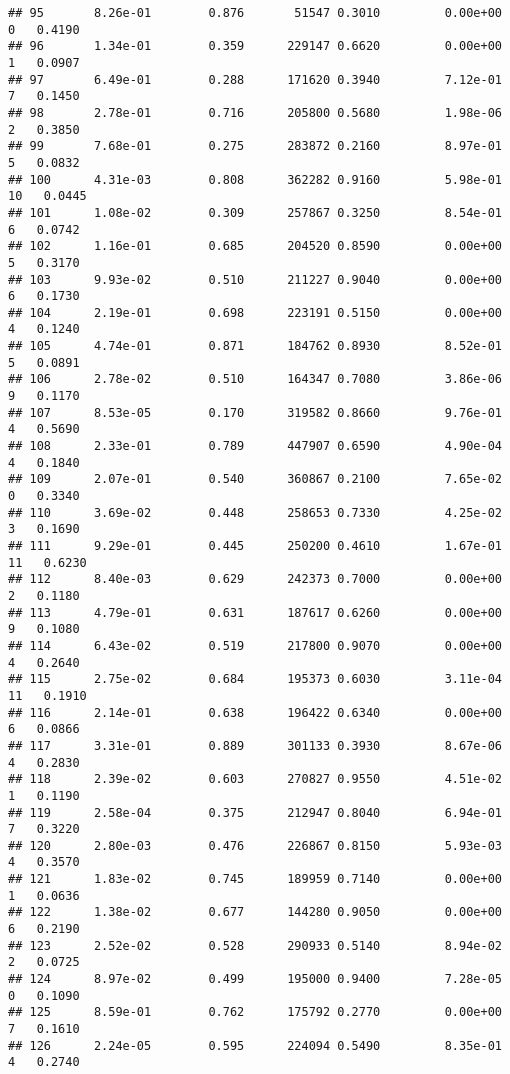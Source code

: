 \documentclass[
]{article}
\begin{document}
\begin{verbatim}
## 95       8.26e-01        0.876       51547 0.3010         0.00e+00   0   0.4190
## 96       1.34e-01        0.359      229147 0.6620         0.00e+00   1   0.0907
## 97       6.49e-01        0.288      171620 0.3940         7.12e-01   7   0.1450
## 98       2.78e-01        0.716      205800 0.5680         1.98e-06   2   0.3850
## 99       7.68e-01        0.275      283872 0.2160         8.97e-01   5   0.0832
## 100      4.31e-03        0.808      362282 0.9160         5.98e-01  10   0.0445
## 101      1.08e-02        0.309      257867 0.3250         8.54e-01   6   0.0742
## 102      1.16e-01        0.685      204520 0.8590         0.00e+00   5   0.3170
## 103      9.93e-02        0.510      211227 0.9040         0.00e+00   6   0.1730
## 104      2.19e-01        0.698      223191 0.5150         0.00e+00   4   0.1240
## 105      4.74e-01        0.871      184762 0.8930         8.52e-01   5   0.0891
## 106      2.78e-02        0.510      164347 0.7080         3.86e-06   9   0.1170
## 107      8.53e-05        0.170      319582 0.8660         9.76e-01   4   0.5690
## 108      2.33e-01        0.789      447907 0.6590         4.90e-04   4   0.1840
## 109      2.07e-01        0.540      360867 0.2100         7.65e-02   0   0.3340
## 110      3.69e-02        0.448      258653 0.7330         4.25e-02   3   0.1690
## 111      9.29e-01        0.445      250200 0.4610         1.67e-01  11   0.6230
## 112      8.40e-03        0.629      242373 0.7000         0.00e+00   2   0.1180
## 113      4.79e-01        0.631      187617 0.6260         0.00e+00   9   0.1080
## 114      6.43e-02        0.519      217800 0.9070         0.00e+00   4   0.2640
## 115      2.75e-02        0.684      195373 0.6030         3.11e-04  11   0.1910
## 116      2.14e-01        0.638      196422 0.6340         0.00e+00   6   0.0866
## 117      3.31e-01        0.889      301133 0.3930         8.67e-06   4   0.2830
## 118      2.39e-02        0.603      270827 0.9550         4.51e-02   1   0.1190
## 119      2.58e-04        0.375      212947 0.8040         6.94e-01   7   0.3220
## 120      2.80e-03        0.476      226867 0.8150         5.93e-03   4   0.3570
## 121      1.83e-02        0.745      189959 0.7140         0.00e+00   1   0.0636
## 122      1.38e-02        0.677      144280 0.9050         0.00e+00   6   0.2190
## 123      2.52e-02        0.528      290933 0.5140         8.94e-02   2   0.0725
## 124      8.97e-02        0.499      195000 0.9400         7.28e-05   0   0.1090
## 125      8.59e-01        0.762      175792 0.2770         0.00e+00   7   0.1610
## 126      2.24e-05        0.595      224094 0.5490         8.35e-01   4   0.2740

\end{verbatim}
\end{document}
